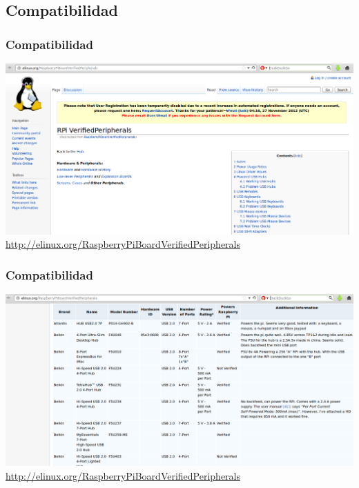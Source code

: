 \documentclass[10pt,colorlinks]{beamer}
\begin{document}
\subsection{Compatibilidad}                               
\begin{frame}\frametitle{Compatibilidad}
    \includegraphics[width=\textwidth]{figs/elinux1}\\
\href{http://elinux.org/RaspberryPiBoardVerifiedPeripherals}{http://elinux.org/RaspberryPiBoardVerifiedPeripherals}
\end{frame}

\begin{frame}[plain]\frametitle{Compatibilidad}
    \includegraphics[width=\textwidth]{figs/elinux2}\\
\href{http://elinux.org/RaspberryPiBoardVerifiedPeripherals}{http://elinux.org/RaspberryPiBoardVerifiedPeripherals}
\end{frame}
\end{document}
